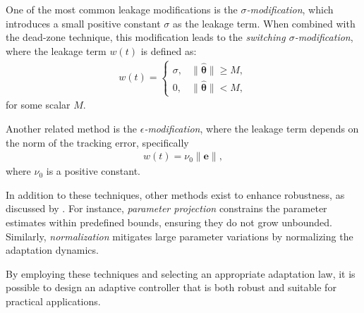 One of the most common leakage modifications is the \emph{$\sigma$-modification}, which introduces a small positive constant $\sigma$ as the leakage term. When combined with the dead-zone technique, this modification leads to the \emph{switching $\sigma$-modification}, where the leakage term $w(t)$ is defined as:
\begin{align}
    w(t) = \begin{cases}
        \sigma, & \|\widehat{\boldsymbol{\theta}}\| \ge M,\\
        0, & \|\widehat{\boldsymbol{\theta}}\| < M,
    \end{cases}
\end{align}
for some scalar $M$.

Another related method is the \emph{$\epsilon$-modification}, where the leakage term depends on the norm of the tracking error, specifically
\begin{align}
    w(t) = \nu_0\|\mathbf{e}\|,
\end{align}
where $\nu_0$ is a positive constant.

In addition to these techniques, other methods exist to enhance robustness, as discussed by \citet[ch. 8]{Ioannou2012}. For instance, \emph{parameter projection} constrains the parameter estimates within predefined bounds, ensuring they do not grow unbounded. Similarly, \emph{normalization} mitigates large parameter variations by normalizing the adaptation dynamics.

By employing these techniques and selecting an appropriate adaptation law, it is possible to design an adaptive controller that is both robust and suitable for practical applications.